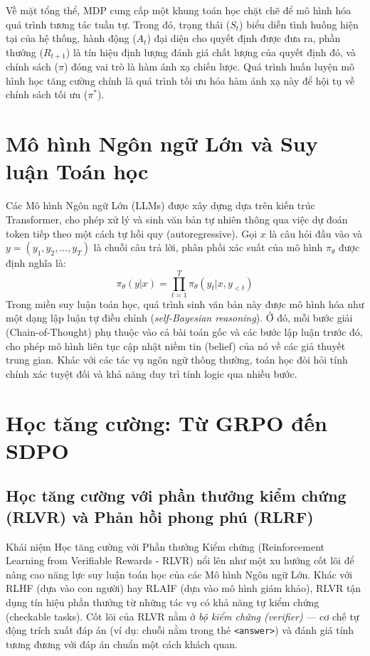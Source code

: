 \documentclass[12pt,a4paper]{report}
\begin{document}
Về mặt tổng thể, MDP cung cấp một khung toán học chặt chẽ để mô hình hóa quá trình tương tác tuần tự. Trong đó, trạng thái ($S_t$) biểu diễn tình huống hiện tại của hệ thống, hành động ($A_t$) đại diện cho quyết định được đưa ra, phần thưởng ($R_{t+1}$) là tín hiệu định lượng đánh giá chất lượng của quyết định đó, và chính sách ($\pi$) đóng vai trò là hàm ánh xạ chiến lược. Quá trình huấn luyện mô hình học tăng cường chính là quá trình tối ưu hóa hàm ánh xạ này để hội tụ về chính sách tối ưu ($\pi^*$).

\section{Mô hình Ngôn ngữ Lớn và Suy luận Toán học}
Các Mô hình Ngôn ngữ Lớn (LLMs) được xây dựng dựa trên kiến trúc Transformer, cho phép xử lý và sinh văn bản tự nhiên thông qua việc dự đoán token tiếp theo một cách tự hồi quy (autoregressive). Gọi $x$ là câu hỏi đầu vào và $y = (y_1, y_2, \dots, y_T)$ là chuỗi câu trả lời, phân phối xác suất của mô hình $\pi_\theta$ được định nghĩa là:
\begin{equation}
    \pi_\theta(y|x) = \prod_{t=1}^T \pi_\theta(y_t | x, y_{<t})
\end{equation}
Trong miền suy luận toán học, quá trình sinh văn bản này được mô hình hóa như một dạng lập luận tự điều chỉnh (\textit{self-Bayesian reasoning}). Ở đó, mỗi bước giải (Chain-of-Thought) phụ thuộc vào cả bài toán gốc và các bước lập luận trước đó, cho phép mô hình liên tục cập nhật niềm tin (belief) của nó về các giả thuyết trung gian. Khác với các tác vụ ngôn ngữ thông thường, toán học đòi hỏi tính chính xác tuyệt đối và khả năng duy trì tính logic qua nhiều bước.

\section{Học tăng cường: Từ GRPO đến SDPO}

\subsection{Học tăng cường với phần thưởng kiểm chứng (RLVR) và Phản hồi phong phú (RLRF)}

Khái niệm Học tăng cường với Phần thưởng Kiểm chứng (Reinforcement Learning from Verifiable Rewards - RLVR) \cite{kyars2026rlvr} nổi lên như một xu hướng cốt lõi để nâng cao năng lực suy luận toán học của các Mô hình Ngôn ngữ Lớn. Khác với RLHF (dựa vào con người) hay RLAIF (dựa vào mô hình giám khảo), RLVR tận dụng tín hiệu phần thưởng từ những tác vụ có khả năng tự kiểm chứng (checkable tasks). Cốt lõi của RLVR nằm ở \textit{bộ kiểm chứng (verifier)} — cơ chế tự động trích xuất đáp án (ví dụ: chuỗi nằm trong thẻ \texttt{<answer>}) và đánh giá tính tương đương với đáp án chuẩn một cách khách quan.
\end{document}
